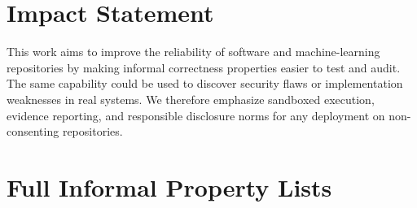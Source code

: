 \documentclass{article}
\theoremstyle{plain}
\theoremstyle{definition}
\theoremstyle{remark}
\begin{document}
\section*{Impact Statement}
This work aims to improve the reliability of software and machine-learning repositories by making informal correctness properties easier to test and audit.
The same capability could be used to discover security flaws or implementation weaknesses in real systems.
We therefore emphasize sandboxed execution, evidence reporting, and responsible disclosure norms for any deployment on non-consenting repositories.





\newpage
\appendix
\onecolumn
\section{Full Informal Property Lists}
\label{app:properties}
\end{document}
